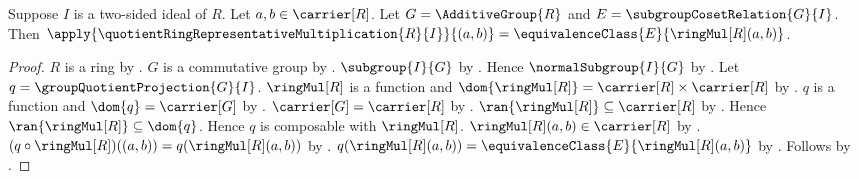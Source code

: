 \begin{proposition}\label{quotient_ring_representative_multiplication_apply}
    Suppose $I$ is a two-sided ideal of $R$.
    Let $a,b\in\carrier[R]$.
    Let $G=\AdditiveGroup{R}$ and $E=\subgroupCosetRelation{G}{I}$.
    Then
        $\apply{\quotientRingRepresentativeMultiplication{R}{I}}{(a,b)}
            =\equivalenceClass{E}{\ringMul[R](a,b)}$.
\end{proposition}
\begin{proof}
    $R$ is a ring by .
    $G$ is a commutative group by
        .
    $\subgroup{I}{G}$ by
        .
    Hence $\normalSubgroup{I}{G}$ by
        .
    Let $q=\groupQuotientProjection{G}{I}$.
    $\ringMul[R]$ is a function and
        $\dom{\ringMul[R]}=\carrier[R]\times\carrier[R]$ by
        .
    $q$ is a function and $\dom{q}=\carrier[G]$ by
        .
    $\carrier[G]=\carrier[R]$ by .
    $\ran{\ringMul[R]}\subseteq\carrier[R]$ by
        .
    Hence $\ran{\ringMul[R]}\subseteq\dom{q}$.
    Hence $q$ is composable with $\ringMul[R]$.
    $\ringMul[R](a,b)\in\carrier[R]$ by .
    $(q\circ\ringMul[R])((a,b))=q(\ringMul[R](a,b))$ by
        .
    $q(\ringMul[R](a,b))
        =\equivalenceClass{E}{\ringMul[R](a,b)}$ by
        .
    Follows by .
\end{proof}

